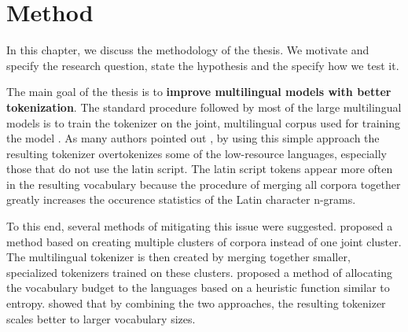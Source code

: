 

\chapter{Method}
\label{chap:method}

In this chapter, we discuss the methodology of the thesis. We motivate and specify the research question, state the hypothesis and the specify how we test it.

The main goal of the thesis is to \textbf{improve multilingual models with better tokenization}. The standard procedure followed by most of the large multilingual models is to train the tokenizer on the joint, multilingual corpus used for training the model \cite{mielke_between_2021,conneau_unsupervised_2020,conneau_cross-lingual_nodate}. As many authors pointed out \cite{wang_improving_2019,chung_improving_2020,rust_how_2021}, by using this simple approach the resulting tokenizer overtokenizes some of the low-resource languages, especially those that do not use the latin script. The latin script tokens appear more often in the resulting vocabulary because the procedure of merging all corpora together greatly increases the occurence statistics of the Latin character n-grams. \cite{zheng_allocating_2021}

To this end, several methods of mitigating this issue were suggested. \citet{chung_improving_2020} proposed a method based on creating multiple clusters of corpora instead of one joint cluster. The multilingual tokenizer is then created by merging together smaller, specialized tokenizers trained on these clusters. \citet{zheng_allocating_2021} proposed a method of allocating the vocabulary budget to the languages based on a heuristic function similar to entropy. \citet{liang_xlm-v_2023} showed that by combining the two approaches, the resulting tokenizer scales better to larger vocabulary sizes.


